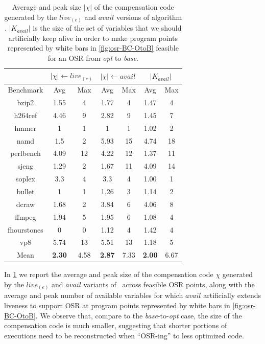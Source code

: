 \begin{table}[!ht]
\begin{center}
\begin{small}
\begin{tabular}{ |c|c|c|c|c|c|c| }
\cline{2-7}
\multicolumn{1}{l|}{} & \multicolumn{2}{c|}{$|\chi|\leftarrow live_{(e)}$} & \multicolumn{2}{c|}{$|\chi|\leftarrow avail$} & \multicolumn{2}{c|}{$|K_{avail}|$} \\
\hline
Benchmark & Avg & Max & Avg & Max & Avg & Max \\
\hline
\hline
bzip2 & 1.55 & 4 & 1.77 & 4 & 1.47 & 4 \\
\hline
h264ref & 4.46 & 9 & 2.82 & 9 & 1.45 & 7 \\
\hline
hmmer & 1 & 1 & 1 & 1 & 1.02 & 2 \\
\hline
namd & 1.5 & 2 & 5.93 & 15 & 4.74 & 18\\
\hline
perlbench & 4.09 & 12 & 4.22 & 12 & 1.37 & 11 \\
\hline
sjeng & 1.29 & 2 & 1.67 & 11 & 4.09 & 14 \\
\hline
soplex & 3.3 & 4 & 3.3 & 4 & 1.00 & 1 \\
\hline
bullet & 1 & 1 & 1.26 & 3 & 1.14 & 2 \\
\hline
dcraw & 1.68 & 2 & 3.84 & 6 & 4.06 & 8 \\
\hline
ffmpeg & 1.94 & 5 & 1.95 & 6 & 1.08 & 4 \\
\hline
fhourstones & 0 & 0 & 1.12 & 4 & 1.42 & 4 \\
\hline
vp8 & 5.74 & 13 & 5.51 & 13 & 1.18 & 5 \\
\hline
\hline
Mean & {\bf 2.30} & 4.58 & {\bf 2.87} & 7.33 & {\bf 2.00} & 6.67 \\
\hline
\end{tabular}
\end{small}
\end{center}
\caption{\label{tab:OSR-alC-prologue-OtoB} Average and peak size $|\chi|$ of the compensation code generated by the $live_{(e)}$ and $avail$ versions of algorithm \reconstruct. $|K_{avail}|$ is the size of the set of variables that we should artificially keep alive in order to make program points represented by white bars in \myfigure\ref{fig:osr-BC-OtoB} feasible for an OSR from {\em opt} to {\em base}.}
\end{table}

\noindent In \mytable\ref{tab:OSR-alC-prologue-OtoB} we report the average and peak size of the compensation code $\chi$ generated by the $live_{(e)}$ and $avail$ variants of \reconstruct\ across feasible OSR points, along with the average and peak number of available variables for which $avail$ artificially extends liveness to support OSR at program points represented by white bars in \myfigure\ref{fig:osr-BC-OtoB}. We observe that, compare to the {\em base}-to-{\em opt} case, the size of the compensation code is much smaller, suggesting that shorter portions of executions need to be reconstructed when ``OSR-ing'' to less optimized code.

